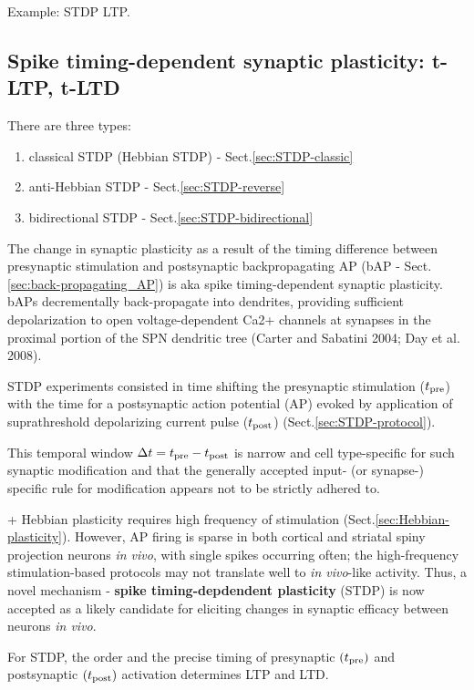Example: STDP LTP.


\subsection{Spike timing-dependent synaptic plasticity: t-LTP, t-LTD}
\label{sec:spike-timing-dependent-plasticity}
\label{sec:STDP}
\label{sec:t-LTP}
\label{sec:t-LTD}

There are three types:
\begin{enumerate}
  \item  classical STDP (Hebbian STDP) - Sect.\ref{sec:STDP-classic}
  
  \item anti-Hebbian STDP - Sect.\ref{sec:STDP-reverse}
  
  \item bidirectional STDP - Sect.\ref{sec:STDP-bidirectional}
\end{enumerate}

The change in synaptic plasticity as a result of the timing difference between
presynaptic stimulation and postsynaptic backpropagating AP (bAP -
Sect.\ref{sec:back-propagating_AP}) is aka spike timing-dependent synaptic
plasticity.
bAPs decrementally back-propagate into dendrites, providing sufficient
depolarization to open voltage-dependent Ca2+ channels at synapses in the
proximal portion of the SPN dendritic tree (Carter and Sabatini 2004; Day et al.
2008).

STDP experiments consisted in time shifting the presynaptic stimulation
($t_{{\text{pre}}}$) with the time for a postsynaptic action potential (AP) evoked by
application of suprathreshold depolarizing current pulse
($t_{{\text{post}}}$) (Sect.\ref{sec:STDP-protocol}).

This temporal window $\Delta t = t_{{\text{pre}}} - t_{{\text{post}}}$ is narrow and cell
type-specific for such synaptic modification and that the generally accepted
input- (or synapse-) specific rule for  modification appears  not to be 
strictly adhered  to.

\begin{mdframed}

+
Hebbian plasticity requires high frequency of stimulation
(Sect.\ref{sec:Hebbian-plasticity}). 
However, AP firing is sparse in both cortical and striatal spiny projection
neurons {\it in vivo}, with single spikes occurring often; the high-frequency
stimulation-based protocols may not translate well to {\it in vivo}-like
activity. Thus, a novel mechanism - {\bf spike timing-depdendent plasticity}
(STDP) is now accepted as a likely candidate for eliciting changes in synaptic
efficacy between neurons {\it in vivo}.


For STDP, the order and the precise timing of presynaptic $(t_{{\text{pre}}})$ and
postsynaptic $(t_{{\text{post}}})$ activation determines LTP and LTD.

\end{mdframed}

